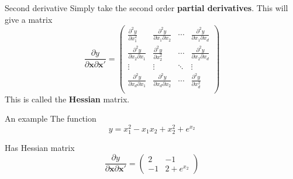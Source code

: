 \documentclass[10pt]{beamer}
\begin{document}
\begin{frame}{Second derivative}
  Simply take the second order {\bf partial derivatives}.  This will give a matrix
  \begin{equation}
    \frac{\partial y}{\partial{\bm x}\partial{\bm x}'}=
    \left(
      \begin{array}{cccc}
        \frac{\partial^2 y}{\partial x_1^2}&\frac{\partial^2 y}{\partial x_1\partial x_2}&\cdots&\frac{\partial^2 y}{\partial x_1\partial x_d}\\
        \frac{\partial^2 y}{\partial x_2\partial x_1}&\frac{\partial^2 y}{\partial x_2^2}&\cdots&\frac{\partial^2 y}{\partial x_2\partial x_d}\\
        \vdots&\vdots&\ddots&\vdots\\
        \frac{\partial^2 y}{\partial x_d\partial x_1}&\frac{\partial^2 y}{\partial x_d\partial x_2}&\cdots&\frac{\partial^2 y}{\partial x_d^2}\\
      \end{array}
    \right)
  \end{equation}
  This is called the {\bf Hessian} matrix.
\end{frame}

\begin{frame}{An example}
  The function
  \begin{equation}
    y=x_1^2-x_1x_2+x_2^2+e^{x_2}
  \end{equation}

  Has Hessian matrix
  \begin{equation}
    \frac{\partial y}{\partial{\bm x}\partial{\bm x}'}=
    \left(
      \begin{array}{cc}
        2 & -1\\
        -1 & 2 + e^{x_2}
      \end{array}
    \right)
  \end{equation}
\end{frame}
\end{document}
